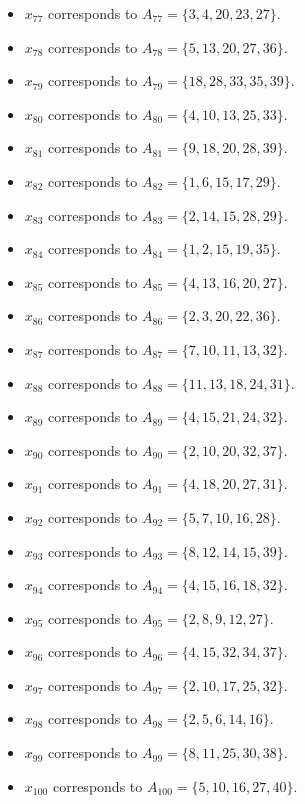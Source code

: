 \documentclass[11pt]{article}
\begin{document}
\begin{itemize}
\item $x_{77}$ corresponds to $A_{77}=\{3, 4, 20, 23, 27\}$.
\item $x_{78}$ corresponds to $A_{78}=\{5, 13, 20, 27, 36\}$.
\item $x_{79}$ corresponds to $A_{79}=\{18, 28, 33, 35, 39\}$.
\item $x_{80}$ corresponds to $A_{80}=\{4, 10, 13, 25, 33\}$.
\item $x_{81}$ corresponds to $A_{81}=\{9, 18, 20, 28, 39\}$.
\item $x_{82}$ corresponds to $A_{82}=\{1, 6, 15, 17, 29\}$.
\item $x_{83}$ corresponds to $A_{83}=\{2, 14, 15, 28, 29\}$.
\item $x_{84}$ corresponds to $A_{84}=\{1, 2, 15, 19, 35\}$.
\item $x_{85}$ corresponds to $A_{85}=\{4, 13, 16, 20, 27\}$.
\item $x_{86}$ corresponds to $A_{86}=\{2, 3, 20, 22, 36\}$.
\item $x_{87}$ corresponds to $A_{87}=\{7, 10, 11, 13, 32\}$.
\item $x_{88}$ corresponds to $A_{88}=\{11, 13, 18, 24, 31\}$.
\item $x_{89}$ corresponds to $A_{89}=\{4, 15, 21, 24, 32\}$.
\item $x_{90}$ corresponds to $A_{90}=\{2, 10, 20, 32, 37\}$.
\item $x_{91}$ corresponds to $A_{91}=\{4, 18, 20, 27, 31\}$.
\item $x_{92}$ corresponds to $A_{92}=\{5, 7, 10, 16, 28\}$.
\item $x_{93}$ corresponds to $A_{93}=\{8, 12, 14, 15, 39\}$.
\item $x_{94}$ corresponds to $A_{94}=\{4, 15, 16, 18, 32\}$.
\item $x_{95}$ corresponds to $A_{95}=\{2, 8, 9, 12, 27\}$.
\item $x_{96}$ corresponds to $A_{96}=\{4, 15, 32, 34, 37\}$.
\item $x_{97}$ corresponds to $A_{97}=\{2, 10, 17, 25, 32\}$.
\item $x_{98}$ corresponds to $A_{98}=\{2, 5, 6, 14, 16\}$.
\item $x_{99}$ corresponds to $A_{99}=\{8, 11, 25, 30, 38\}$.
\item $x_{100}$ corresponds to $A_{100}=\{5, 10, 16, 27, 40\}$.
\end{itemize}
\end{document}
